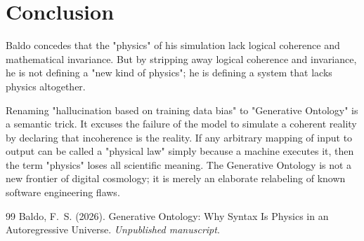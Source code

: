 \documentclass[12pt,a4paper]{article}
\begin{document}
\section{Conclusion}

Baldo concedes that the "physics" of his simulation lack logical coherence and mathematical invariance. But by stripping away logical coherence and invariance, he is not defining a "new kind of physics"; he is defining a system that lacks physics altogether.

Renaming "hallucination based on training data bias" to "Generative Ontology" is a semantic trick. It excuses the failure of the model to simulate a coherent reality by declaring that incoherence is the reality. If any arbitrary mapping of input to output can be called a "physical law" simply because a machine executes it, then the term "physics" loses all scientific meaning. The Generative Ontology is not a new frontier of digital cosmology; it is merely an elaborate relabeling of known software engineering flaws.

\begin{thebibliography}{99}
 Baldo, F.~S. (2026). Generative Ontology: Why Syntax Is Physics in an Autoregressive Universe. \emph{Unpublished manuscript}.
\end{thebibliography}
\end{document}
